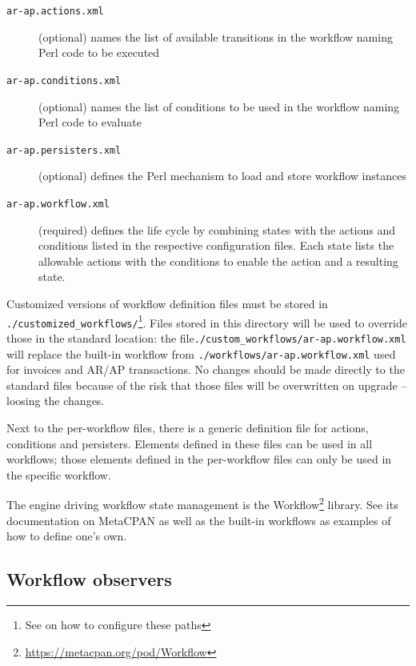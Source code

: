 \begin{description}
	\item [\texttt{ar-ap.actions.xml}] (optional) names the list of available transitions
	in the workflow naming Perl code to be executed
	\item [\texttt{ar-ap.conditions.xml}] (optional) names the list of conditions to be used
	in the workflow naming Perl code to evaluate
	\item [\texttt{ar-ap.persisters.xml}] (optional) defines the Perl mechanism to load and store
	workflow instances
	\item [\texttt{ar-ap.workflow.xml}] (required) defines the life cycle by combining states with
	the actions and conditions listed in the respective configuration files. Each state lists
	the allowable actions with the conditions to enable the action and a resulting state.
\end{description}

Customized versions of workflow definition files must be stored in \linebreak
 \texttt{./customized\_workflows/}\footnote{See
 	 on how to configure
 these paths}.  Files stored in this directory will be used to override those in
the standard location: the file\linebreak \texttt{./custom\_workflows/ar-ap.workflow.xml} will replace the built-in workflow
from \texttt{./workflows/ar-ap.workflow.xml} used for invoices and \linebreak AR/AP transactions.
No changes should be made directly to the standard files because of the risk that those
files will be overwritten on upgrade -- loosing the changes.

Next to the per-workflow files, there is a generic definition file for actions,
conditions and persisters.  Elements defined in these files can be used in all
workflows; those elements defined in the per-workflow files can only be used
in the specific workflow.

The engine driving workflow state management is the
Workflow\footnote{\url{https://metacpan.org/pod/Workflow}} library.  See its
documentation on MetaCPAN as well as the built-in workflows as examples of how
to define one's own.

\subsection{Workflow observers}
\label{subsec-customization-workflow-observers}

